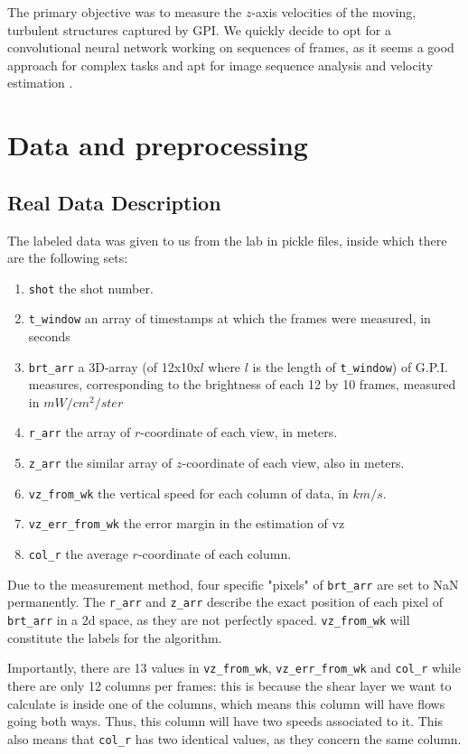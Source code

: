 \documentclass[10pt,conference]{IEEEtran}
\begin{document}
The primary objective was to measure the $z$-axis velocities of the moving, turbulent structures captured by GPI. We quickly decide to opt for a convolutional neural network working on sequences of frames, as it seems a good approach for complex tasks and apt for image sequence analysis and velocity estimation \cite{velocitycnn}.



\section{Data and preprocessing}

\subsection{Real Data Description}
The labeled data was given to us from the lab in pickle files, inside which there are the following sets:
\begin{enumerate}
  \item \texttt{shot} the shot number.
  \item \texttt{t\_window} an array of timestamps at which the frames were measured, in seconds
  \item \texttt{brt\_arr} a 3D-array (of 12x10x$l$ where $l$ is the length of \texttt{t\_window}) of G.P.I. measures, corresponding to the brightness of each 12 by 10 frames, measured in $mW/cm^2/ster$
  \item \texttt{r\_arr} the array of $r$-coordinate of each view, in meters.
  \item \texttt{z\_arr} the similar array of $z$-coordinate of each view, also in meters.
  \item \texttt{vz\_from\_wk} the vertical speed for each column of data, in $km/s$.
  \item \texttt{vz\_err\_from\_wk} the error margin in the estimation of vz
  \item \texttt{col\_r} the average $r$-coordinate of each column.
\end{enumerate}
Due to the measurement method, four specific "pixels" of \texttt{brt\_arr} are set to NaN permanently. The \texttt{r\_arr} and \texttt{z\_arr} describe the exact position of each pixel of \texttt{brt\_arr} in a 2d space, as they are not perfectly spaced. \texttt{vz\_from\_wk} will constitute the labels for the algorithm.\par
Importantly, there are 13 values in \texttt{vz\_from\_wk}, \texttt{vz\_err\_from\_wk} and \texttt{col\_r} while there are only 12 columns per frames: this is because the shear layer we want to calculate is inside one of the columns, which means this column will have flows going both ways. Thus, this column will have two speeds associated to it. This also means that \texttt{col\_r} has two identical values, as they concern the same column.\par
\end{document}
